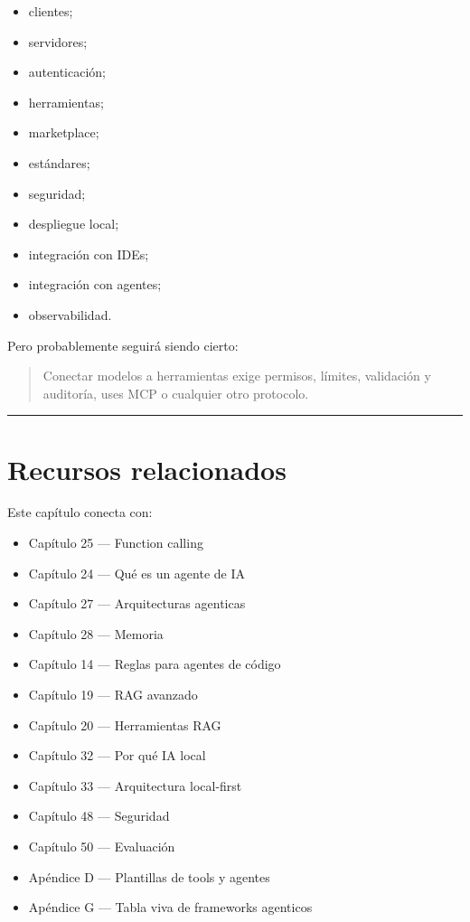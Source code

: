 \begin{itemize}
\tightlist
\item
  clientes;
\item
  servidores;
\item
  autenticación;
\item
  herramientas;
\item
  marketplace;
\item
  estándares;
\item
  seguridad;
\item
  despliegue local;
\item
  integración con IDEs;
\item
  integración con agentes;
\item
  observabilidad.
\end{itemize}

Pero probablemente seguirá siendo cierto:

\begin{quote}
Conectar modelos a herramientas exige permisos, límites, validación y
auditoría, uses MCP o cualquier otro protocolo.
\end{quote}

\begin{center}\rule{0.5\linewidth}{0.5pt}\end{center}

\section{Recursos relacionados}\label{recursos-relacionados-25}

Este capítulo conecta con:

\begin{itemize}
\tightlist
\item
  Capítulo 25 --- Function calling
\item
  Capítulo 24 --- Qué es un agente de IA
\item
  Capítulo 27 --- Arquitecturas agenticas
\item
  Capítulo 28 --- Memoria
\item
  Capítulo 14 --- Reglas para agentes de código
\item
  Capítulo 19 --- RAG avanzado
\item
  Capítulo 20 --- Herramientas RAG
\item
  Capítulo 32 --- Por qué IA local
\item
  Capítulo 33 --- Arquitectura local-first
\item
  Capítulo 48 --- Seguridad
\item
  Capítulo 50 --- Evaluación
\item
  Apéndice D --- Plantillas de tools y agentes
\item
  Apéndice G --- Tabla viva de frameworks agenticos
\end{itemize}

